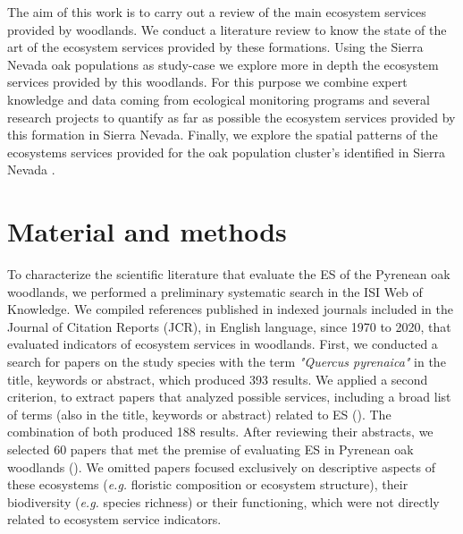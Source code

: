 The aim of this work is to carry out a review of the main ecosystem services provided by \Qp woodlands. We conduct a literature review to know the state of the art of the ecosystem services provided by these formations. Using the Sierra Nevada oak populations as study-case we explore more in depth the ecosystem services provided by this woodlands. For this purpose we combine expert knowledge and data coming from ecological monitoring programs and several research projects to quantify as far as possible the ecosystem services provided by this formation in Sierra Nevada. Finally, we explore the spatial patterns of the ecosystems services provided for the oak population cluster's identified in Sierra Nevada \autocite[see][]{PerezLuqueetal2021EcologicalDiversity}.  

\section{Material and methods}\label{sec:es:mat}

To characterize the scientific literature that evaluate the ES of the Pyrenean oak woodlands, we performed a preliminary systematic search in the ISI Web of Knowledge. We compiled references published in indexed journals included in the Journal of Citation Reports (JCR), in English language, since 1970 to 2020, that evaluated indicators of ecosystem services in \Qp woodlands. First, we conducted a search for papers on the study species with the term \emph{"Quercus pyrenaica"} in the title, keywords or abstract, which produced 393 results. We applied a second criterion, to extract papers that analyzed possible services, including a broad list of terms (also in the title, keywords or abstract) related to ES (). The combination of both produced 188 results. After reviewing their abstracts, we selected 60 papers that met the premise of evaluating ES in Pyrenean oak woodlands (). We omitted papers focused exclusively on descriptive aspects of these ecosystems (\emph{e.g.} floristic composition or ecosystem structure), their biodiversity (\emph{e.g.} species richness) or their functioning, which were not directly related to ecosystem service indicators.

